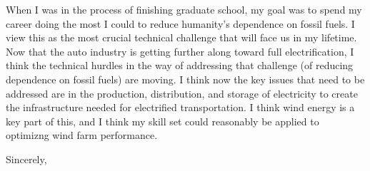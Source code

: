 \documentclass[11pt]{letter} %
\begin{document}
\begin{letter}{}
When I was in the process of finishing graduate school, my goal was to
spend my career doing the most I could to reduce humanity's dependence
on fossil fuels.  I view this as the most crucial technical challenge
that will face us in my lifetime.  Now that the auto industry is
getting further along toward full electrification, I think the
technical hurdles in the way of addressing that challenge (of reducing
dependence on fossil fuels) are moving.  I think now the key issues
that need to be addressed are in the production, distribution, and
storage of electricity to create the infrastructure needed for
electrified transportation.  I think wind energy is a key part of
this, and I think my skill set could reasonably be applied to
optimizng wind farm performance.

\closing{Sincerely,}




\end{letter}
\end{document}
